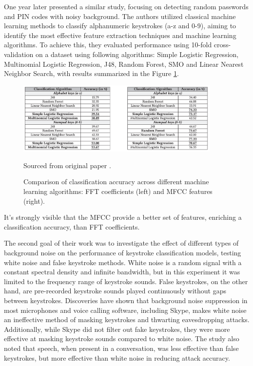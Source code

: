 \documentclass[a4paper,11pt,twoside]{report}
\theoremstyle{definition}
\begin{document}
One year later \textit{\cite{anand2018keyboard}} presented a similar study, focusing on detecting random passwords and PIN codes with noisy background. The authors utilized classical machine learning methods to classify alphanumeric keystrokes (a-z and 0-9), aiming to identify the most effective feature extraction techniques and machine learning algorithms. To achieve this, they evaluated performance using 10-fold cross-validation on a dataset using following algorithms: Simple Logistic Regression, Multinomial Logistic Regression, J48, Random Forest, SMO and Linear Nearest Neighbor Search, with results summarized in the Figure \ref{fig:anand2018}.

\begin{figure}[h!]
    \centering
    \includegraphics[width=0.9\textwidth]{img_related_work/fft_vs_mfcc.png}
    \caption{Comparison of classification accuracy across different machine learning algorithms: FFT coefficients (left) and MFCC features (right).}
    \footnotesize{Sourced from original paper \cite{anand2018keyboard}.}
    \label{fig:anand2018}
\end{figure}

It's strongly visible that the MFCC provide a better set of features, enriching a classification accuracy, than FFT coefficients.

The second goal of their work was to investigate the effect of different types of background noise on the performance of keystroke classification models, testing white noise and false keystroke methods. White noise is a random signal with a constant spectral density and infinite bandwidth, but in this experiment it was limited to the frequency range of keystroke sounds. False keystrokes, on the other hand, are pre-recorded keystroke sounds played continuously without gaps between keystrokes. Discoveries have shown that background noise suppression in most microphones and voice calling software, including Skype, makes white noise an ineffective method of masking keystrokes and thwarting eavesdropping attacks. Additionally, while Skype did not filter out fake keystrokes, they were more effective at masking keystroke sounds compared to white noise. The study also noted that speech, when present in a conversation, was less effective than false keystrokes, but more effective than white noise in reducing attack accuracy. \\
\end{document}
